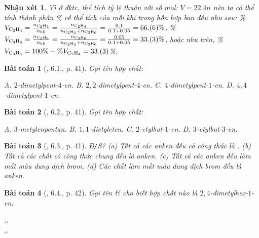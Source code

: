 \documentclass{article}
\newtheorem{baitoan}{Bài toán}
\newtheorem{nhanxet}{Nhận xét}
\begin{document}
\begin{nhanxet}
	Vì ở đktc, thể tích tỷ lệ thuận với số mol: $V = 22.4n$ nên ta có thể tính thành phần \% về thể tích của mỗi khí trong hỗn hợp ban đầu như sau: \%$V_{\ce{C2H4}} = \frac{n_{\ce{C2H4}}}{n_{\rm hh}} = \frac{n_{\ce{C2H4}}}{n_{\ce{C2H4}} + n_{\ce{C3H6}}} = \frac{0.1}{0.1 + 0.05} = 66.(6)\%$, \%$V_{\ce{C3H6}} =\frac{n_{\ce{C3H6}}}{n_{\rm hh}} = \frac{n_{\ce{C3H6}}}{n_{\ce{C2H4}} + n_{\ce{C3H6}}} = \frac{0.05}{0.1 + 0.05} = 33.(3)\%$, hoặc như trên, \%$V_{\ce{C3H6}} = 100\% - \%V_{\ce{C2H4}} = 33.(3)$\%.
\end{nhanxet}

\begin{baitoan}[\cite{SBT_Hoa_Hoc_11_co_ban}, 6.1., p. 41]
	Gọi tên hợp chất:
	\begin{center}
	\end{center}
	{\sf A.} $2$-đimetylpent-$4$-en. {\sf B.} $2,2$-đimetylpent-$4$-en. {\sf C.} $4$-đimetylpent-$1$-en. {\sf D.} $4,4$-đimetylpent-$1$-en.
\end{baitoan}

\begin{baitoan}[\cite{SBT_Hoa_Hoc_11_co_ban}, 6.2., p. 41]
	Gọi tên hợp chất:
	\begin{center}
	\end{center}
	{\sf A.} $3$-metylenpentan. {\sf B.} $1,1$-đietyleten. {\sf C.} $2$-etylbut-$1$-en. {\sf D.} $3$-etylbut-$3$-en.
\end{baitoan}

\begin{baitoan}[\cite{SBT_Hoa_Hoc_11_co_ban}, 6.3., p. 41]
	\emph{Đ\texttt{/}S?} (a) Tất cả các anken đều có công thức là \emph{}. (b) Tất cả các chất có công thức chung \emph{} đều là anken. (c) Tất cả các anken đều làm mất màu dung dịch brom. (d) Các chất làm mất màu dung dịch brom đều là anken.
\end{baitoan}

\begin{baitoan}[\cite{SBT_Hoa_Hoc_11_co_ban}, 6.4., p. 42]
	Gọi tên \& cho biết hợp chất nào là $2,4$-đimetylhex-$1$-en:
	\begin{center}
		,\hspace{1cm},\\\vspace{5mm},\hspace{1cm}.
	\end{center}
\end{baitoan}
\end{document}
